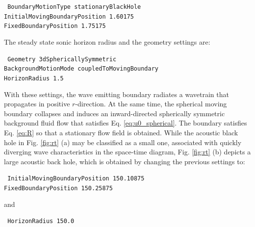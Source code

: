 {\tt
BoundaryMotionType stationaryBlackHole \\
InitialMovingBoundaryPosition 1.60175 \\
FixedBoundaryPosition 1.75175
}

The steady state sonic horizon radius and the geometry settings are:

{\tt
Geometry 3dSphericallySymmetric \\
BackgroundMotionMode coupledToMovingBoundary \\
HorizonRadius 1.5
}

With these settings, the wave emitting boundary radiates a wavetrain that propagates in positive $r$-direction. At the same time, the spherical moving boundary collapses and induces an inward-directed spherically symmetric background fluid flow that satisfies Eq. \eqref{eq:u0_spherical}. The boundary satisfies Eq. \eqref{eq:R} so that a stationary flow field is obtained. While the acoustic black hole in Fig. \ref{fig:rt} (a) may be classified as a small one, associated with quickly diverging wave characteristics in the space-time diagram, Fig. \ref{fig:rt} (b) depicts a large acoustic back hole, which is obtained by changing the previous settings to:

{\tt
InitialMovingBoundaryPosition 150.10875  \\
FixedBoundaryPosition 150.25875
}

and

    {\tt
        HorizonRadius 150.0
    }

